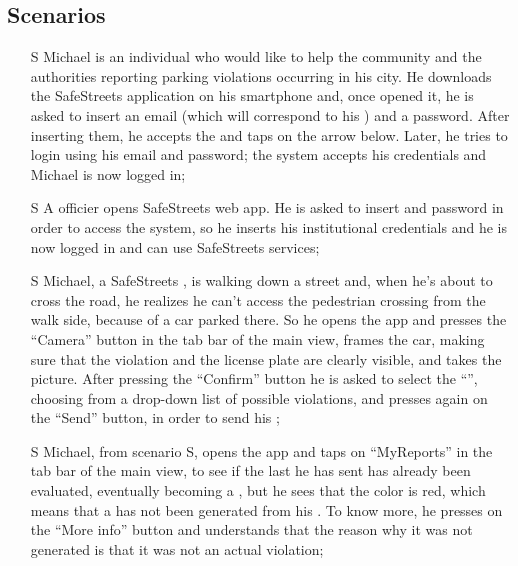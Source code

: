 \documentclass[../../../RASD.tex]{subfiles}
\begin{document}
\subsection{Scenarios\label{sect:3.2.1}}

\begin{itemize}
	\item[S\subs{1}]Michael is an individual who would like to help the community and the authorities reporting parking violations occurring in his city. He downloads the SafeStreets application on his smartphone and, once opened it, he is asked to insert an email (which will correspond to his ) and a password. After inserting them, he accepts the  and taps on the arrow below. Later, he tries to login using his email and password; the system accepts his credentials and Michael is now logged in;
	
	\item[S\subs{2}]A  officier opens SafeStreets web app. He is asked to insert  and password in order to access the system, so he inserts his  institutional credentials and he is now logged in and can use SafeStreets services;
	
	\item[S\subs{3}]Michael, a SafeStreets , is walking down a street and, when he’s about to cross the road, he realizes he can’t access the pedestrian crossing from the walk side, because of a car parked there. So he opens the app and presses the “Camera” button in the tab bar of the main view, frames the car, making sure that the violation and the license plate are clearly visible, and takes the picture. After pressing the “Confirm” button he is asked to select the “”, choosing from a drop-down list of possible violations, and presses again on the “Send” button, in order to send his ;
	
	\item[S\subs{4}]Michael, from scenario S, opens the app and taps on “MyReports” in the tab bar of the main view, to see if the last  he has sent has already been evaluated, eventually becoming a , but he sees that the  color is red, which means that a  has not been generated from his . To know more, he presses on the “More info” button and understands that the reason why it was not generated is that it was not an actual violation;
	

\end{itemize}
\end{document}

